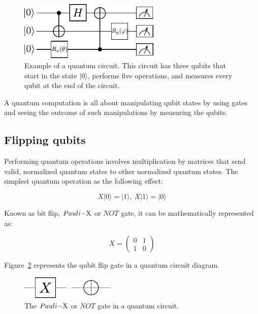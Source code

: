 \begin{figure}[!htbp]
\centering
	\includegraphics[width=0.60\textwidth]{figures/qcircuit.pdf}
\caption{Example of a quantum circuit. This circuit has three qubits that start 
in the state $\vert 0 \rangle$, performs five operations, and measures every 
qubit at the end of the circuit.}
\label{fig:circuit}
\end{figure}

A quantum computation is all about manipulating qubit states by using gates and
seeing the outcome of such manipulations by measuring the qubits.

\subsection{Flipping qubits}
\label{sec:flip}

Performing quantum operations involves multiplication by matrices that send 
valid, normalized quantum states to other normalized quantum states. The 
simplest quantum operation as the following effect:

\begin{linenomath}
\begin{equation}
	X\vert 0 \rangle = \vert 1 \rangle, \
	X\vert 1 \rangle = \vert 0 \rangle
\label{eq:flip}
\end{equation}
\end{linenomath}

Known as bit flip, $Pauli\rm{-}X$ or $NOT$ gate, it can be mathematically represented as:

\begin{linenomath}
\begin{equation}
	X = \begin{pmatrix}
	0 & 1 \\
	1 & 0
	\end{pmatrix}
\label{eq:flipX}
\end{equation}
\end{linenomath}

Figure~\ref{fig:circuitX} represents the qubit flip gate in a quantum circuit 
diagram.

\begin{figure}[!htbp]
\centering
	\includegraphics[width=0.40\textwidth]{figures/X.pdf}
\caption{The $Pauli\rm{-}X$ or $NOT$ gate in a quantum circuit.}
\label{fig:circuitX}
\end{figure}

